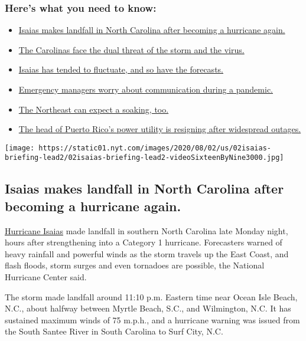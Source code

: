 \hypertarget{heres-what-you-need-to-know}{%
\subsubsection{Here's what you need to
know:}\label{heres-what-you-need-to-know}}

\begin{itemize}
\tightlist
\item
  \protect\hyperlink{link-34a2c843}{Isaias makes landfall in North
  Carolina after becoming a hurricane again.}
\item
  \protect\hyperlink{link-f7e08eb}{The Carolinas face the dual threat of
  the storm and the virus.}
\item
  \protect\hyperlink{link-64deafd3}{Isaias has tended to fluctuate, and
  so have the forecasts.}
\item
  \protect\hyperlink{link-536a9c31}{Emergency managers worry about
  communication during a pandemic.}
\item
  \protect\hyperlink{link-52f7dcb}{The Northeast can expect a soaking,
  too.}
\item
  \protect\hyperlink{link-303d84ae}{The head of Puerto Rico's power
  utility is resigning after widespread outages.}
\end{itemize}

\texttt{[image: https://static01.nyt.com/images/2020/08/02/us/02isaias-briefing-lead2/02isaias-briefing-lead2-videoSixteenByNine3000.jpg]}

\hypertarget{isaias-makes-landfall-in-north-carolina-after-becoming-a-hurricane-again}{%
\subsection{Isaias makes landfall in North Carolina after becoming a
hurricane
again.}\label{isaias-makes-landfall-in-north-carolina-after-becoming-a-hurricane-again}}

\href{https://www.nytimes.com/2020/08/04/nyregion/isaias-tropical-storm-nyc.html}{Hurricane
Isaias} made landfall in southern North Carolina late Monday night,
hours after strengthening into a Category 1 hurricane. Forecasters
warned of heavy rainfall and powerful winds as the storm travels up the
East Coast, and flash floods, storm surges and even tornadoes are
possible, the National Hurricane Center said.

The storm made landfall around 11:10 p.m. Eastern time near Ocean Isle
Beach, N.C., about halfway between Myrtle Beach, S.C., and Wilmington,
N.C. It has sustained maximum winds of 75 m.p.h., and a hurricane
warning was issued from the South Santee River in South Carolina to Surf
City, N.C.

